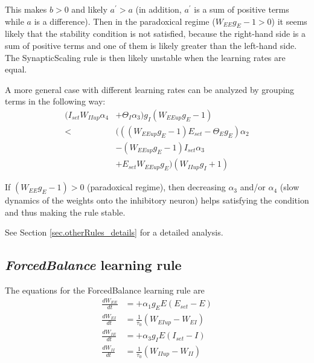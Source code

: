 \documentclass[twocolumn]{article}
\newcommand{\EE}{\mathit{EE}}
\newcommand{\EI}{\mathit{EI}}
\newcommand{\IE}{\mathit{IE}}
\newcommand{\II}{\mathit{II}}
\newcommand{\set}{\mathit{set}}
\newcommand{\up}{\mathit{up}}
\begin{document}
\noindent This makes $b>0$ and likely $a^\prime>a$ (in addition, $a^\prime$ is a sum of positive terms while $a$ is a difference). Then in the paradoxical regime ($W_{\EE}g_E - 1 > 0$) it seems likely that the stability condition is not satisfied, because the right-hand side is a sum of positive terms and one of them is likely greater than the left-hand side. The SynapticScaling rule is then likely unstable when the learning rates are equal.

A more general case with different learning rates can be analyzed by grouping terms in the following way:
\begin{displaymath}
\begin{aligned}
(I_{\set} W_{\II\up} \alpha_4 & + \Theta_I\alpha_3) g_I(W_{\EE\up} g_E - 1) \\
< & (((W_{\EE\up} g_E - 1) E_{\set} - \Theta_E g_E)\alpha_2 \\
& -(W_{\EE\up} g_E - 1) I_{\set}\alpha_3 \\
& + E_{\set} W_{\EE\up} g_E) (W_{\II\up} g_I + 1)
\end{aligned}
\label{eq.SS_stable_cond_v3_summary}
\end{displaymath}

\noindent If $(W_{EE}g_E - 1) > 0$ (paradoxical regime), then decreasing $\alpha_3$ and/or $\alpha_4$ (slow dynamics of the weights onto the inhibitory neuron) helps satisfying the condition and thus making the rule stable.

See Section \ref{sec.otherRules_details} for a detailed analysis.




\subsection{{\em ForcedBalance} learning rule}

The equations for the ForcedBalance learning rule are
\begin{equation}
\begin{aligned}
\frac{dW_{\EE}}{dt} & = +\alpha_1 g_E E(E_{\set} - E) \\
\frac{dW_{\EI}}{dt} & = \frac{1}{\tau_0} (W_{\EI\up} - W_{\EI}) \\
\frac{dW_{\IE}}{dt} & = +\alpha_3 g_I E(I_{\set} - I) \\
\frac{dW_{\II}}{dt} & = \frac{1}{\tau_0} (W_{\II\up} - W_{\II})
\end{aligned}
\label{eq.FB_summary}
\end{equation}
\end{document}
